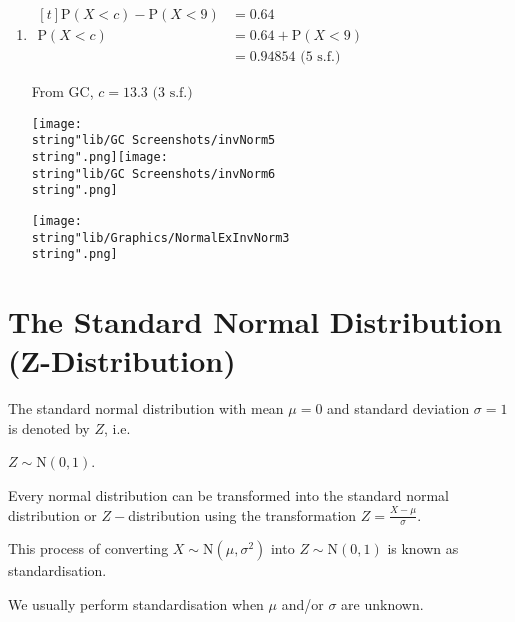 \documentclass[11pt,a4paper]{book}
\begin{document}
\begin{example}
\begin{enumerate}[label=(\alph*)]
\begin{minipage}[t]{.3\textwidth}
\end{minipage}

\item
$
\begin{aligned}[t]
\text{P}\left(X<c\right)-\text{P}\left(X<9\right) & =0.64\\
\text{P}\left(X<c\right) & =0.64+\text{P}\left(X<9\right)\\
 & =0.94854\text{ (5 s.f.)}
\end{aligned}
$

\begin{minipage}[t]{.6\textwidth}

From GC, $c=13.3\text{ (3 s.f.)}$

\texttt{[image: \\string"lib/GC Screenshots/invNorm5\\string".png]}\hspace{1cm}\texttt{[image: \\string"lib/GC Screenshots/invNorm6\\string".png]}

\end{minipage}
\begin{minipage}[t]{.3\textwidth}
\begin{center}
\texttt{[image: \\string"lib/Graphics/NormalExInvNorm3\\string".png]}
\par\end{center}

\end{minipage}

\end{enumerate}

\end{example}

\section{The Standard Normal Distribution (Z-Distribution)}

The standard normal distribution with mean $\mu=0$ and standard deviation $\sigma=1$ is denoted by $Z$, i.e.

$Z\sim\text{N}\left(0,1\right)$.

Every normal distribution can be transformed into the standard normal
distribution or $Z-$distribution using the transformation ${\displaystyle Z=\frac{X-\mu}{\sigma}}$.

This process of converting $X\sim\text{N}\left(\mu,\sigma^{2}\right)$
into $Z\sim\text{N}\left(0,1\right)$ is known as standardisation.

We usually perform standardisation when $\mu$ and/or $\sigma$ are
unknown.
\end{document}
